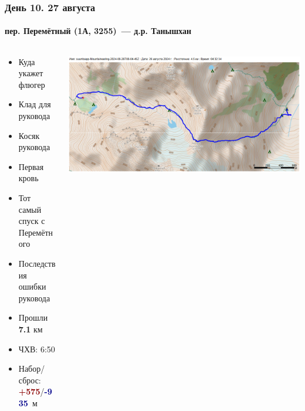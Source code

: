 	\begin{frame}
	\frametitle{День 10. 27 августа}
	\framesubtitle{\textbf{пер. Перемётный (1А, 3255)}~--- д.р. Танышхан} %
	\begin{columns}[c] %
		\begin{column}{0.55\textwidth} %
			\begin{itemize}
				\item Куда укажет флюгер
				\item Клад для руковода
				\item Косяк руковода
				\item Первая кровь
				\item Тот самый спуск с Перемётного
				\item Последствия ошибки руковода
				\item Прошли \textbf{7.1} км
				\item ЧХВ: 6:50
				\item Набор/сброс: \textcolor{darkred}{\textbf{+575}}/\textcolor{darkblue}{\textbf{-935}}~м
			\end{itemize}
			
		\end{column}
		\begin{column}{0.45\textwidth} %
			\centering
			\includegraphics[width=\linewidth]{../pics/mini_maps/26}
		\end{column}
	\end{columns}
\end{frame}

